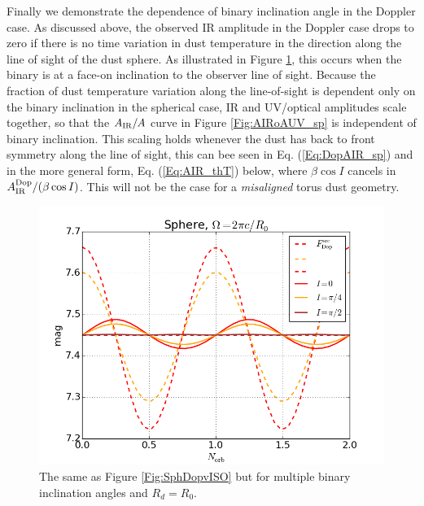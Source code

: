 Finally we demonstrate the dependence of binary inclination angle in the
Doppler case. As discussed above, the observed IR amplitude in the Doppler
case drops to zero if there is no time variation in dust temperature in the
direction along the line of sight of the dust sphere. As illustrated in Figure
\ref{Fig:Sph_VarI}, this occurs when the binary is at a face-on inclination to
the observer line of sight. Because the fraction of dust temperature variation
along the line-of-sight is dependent only on the binary inclination in the
spherical case, IR and UV/optical amplitudes scale together, so that the
$A_{\rm IR}/A$ curve in Figure \ref{Fig:AIRoAUV_sp} is independent of binary
inclination. This scaling holds whenever the dust has back to front symmetry
along the line of sight, this can bee seen in Eq. (\ref{Eq:DopAIR_sp}) and in
the more general form, Eq. (\ref{Eq:AIR_thT}) below, where $\beta \cos{I}$
cancels in $A^{\rm{Dop}}_{\rm IR}/(\beta \cos{I})$. This will not be the case
for a \textit{misaligned} torus dust geometry.

\begin{figure}
\begin{center}
\includegraphics[scale=0.33]{figures/ch5/Sphere/FDop_Sphere_nrm0p0105326_Rde2p73218e+18_VaryInc_numin0_numx5} 
\end{center}
\caption{The same as Figure \ref{Fig:SphDopvISO} but for multiple binary 
inclination angles and $R_d = R_0$.}
\label{Fig:Sph_VarI}
\end{figure}






